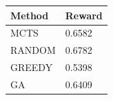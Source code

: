 \begin{tabular}{ll}
\hline
Method & Reward \\
\hline
  MCTS & 0.6582 \\
  RANDOM & 0.6782 \\
  GREEDY & 0.5398 \\
  GA & 0.6409 \\
\hline
\end{tabular}
